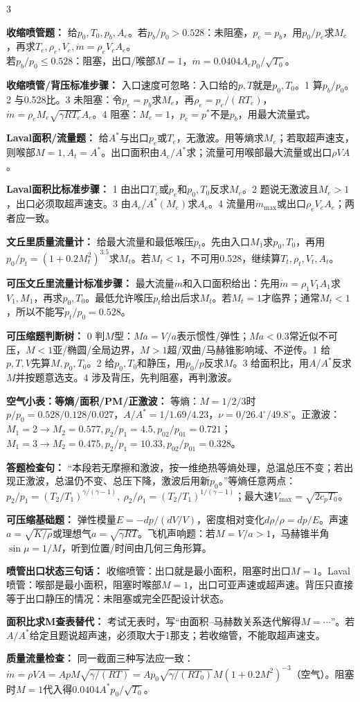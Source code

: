 \documentclass[a4paper]{article}
\newcommand{\sect}[1]{\par{\bfseries\color{Q}#1：}}
\begin{document}
\begin{multicols}{3}
{\sect{收缩喷管题}
给$p_0,T_0,p_b,A_e$。若$p_b/p_0>0.528$：未阻塞，$p_e=p_b$，用$p_0/p_e$求$M_e$，再求$T_e,\rho_e,V_e,\dot m=\rho_eV_eA_e$。\\
若$p_b/p_0\le0.528$：阻塞，出口/喉部$M=1$，$\dot m=0.0404A_ep_0/\sqrt{T_0}$。
\sect{收缩喷管/背压标准步骤}
入口速度可忽略：入口给的$p,T$就是$p_0,T_0$。1 算$p_b/p_0$。2 与0.528比。3 未阻塞：令$p_e=p_b$求$M_e$，再$\rho_e=p_e/(RT_e)$，$\dot m=\rho_eM_e\sqrt{\gamma RT_e}A_e$。4 阻塞：$M_e=1$，$p_e=p^*$不是$p_b$，用最大流量式。

\sect{Laval面积/流量题}
给$A^*$与出口$p_e$或$T_e$，无激波。用等熵求$M_e$；若取超声速支，则喉部$M=1,A_t=A^*$。出口面积由$A_e/A^*$求；流量可用喉部最大流量或出口$\rho VA$。
\sect{Laval面积比标准步骤}
1 由出口$T_e$或$p_e$和$p_0,T_0$反求$M_e$。2 题说无激波且$M_e>1$，出口必须取超声速支。3 由$A_e/A^*(M_e)$求$A_e$。4 流量用$\dot m_{\max}$或出口$\rho_eV_eA_e$；两者应一致。

\sect{文丘里质量流量计}
给最大流量和最低喉压$p_t$。先由入口$M_1$求$p_0,T_0$，再用$p_0/p_t=(1+0.2M_t^2)^{3.5}$求$M_t$。若$M_t<1$，不可用0.528，继续算$T_t,\rho_t,V_t,A_t$。
\sect{可压文丘里流量计标准步骤}
最大流量$\dot m$和入口面积给出：先用$\dot m=\rho_1V_1A_1$求$V_1,M_1$，再求$p_0,T_0$。最低允许喉压$p_t$给出后求$M_t$。若$M_t=1$才临界；通常$M_t<1$，所以不能写$p_t/p_0=0.528$。
\sect{可压缩题判断树}
0 判$M$型：$Ma=V/a$表示惯性/弹性；$Ma<0.3$常近似不可压，$M<1$亚/椭圆/全局边界，$M>1$超/双曲/马赫锥影响域、不逆传。1 给$p,T,V$先算$M,p_0,T_0$。2 给$p_0,T_0$和静压，用$p_0/p$反求$M$。3 给面积比，用$A/A^*$反求$M$并按题意选支。4 涉及背压，先判阻塞，再判激波。
\sect{空气小表：等熵/面积/PM/正激波}
等熵：$M=1/2/3$时$p/p_0=0.528/0.128/0.027$，$A/A^*=1/1.69/4.23$，$\nu=0/26.4^\circ/49.8^\circ$。正激波：$M_1=2\to M_2=0.577,p_2/p_1=4.5,p_{02}/p_{01}=0.721$；$M_1=3\to M_2=0.475,p_2/p_1=10.33,p_{02}/p_{01}=0.328$。
\sect{答题检查句}
“本段若无摩擦和激波，按一维绝热等熵处理，总温总压不变；若出现正激波，总温仍不变、总压下降，激波后用新$p_0$。”等熵任意两点：$p_2/p_1=(T_2/T_1)^{\gamma/(\gamma-1)},\ \rho_2/\rho_1=(T_2/T_1)^{1/(\gamma-1)}$；最大速$V_{\max}=\sqrt{2c_pT_0}$。
\sect{可压缩基础题}
弹性模量$E=-dp/(dV/V)$，密度相对变化$d\rho/\rho=dp/E$。声速$a=\sqrt{K/\rho}$或理想气$a=\sqrt{\gamma RT}$。飞机声响题：若$M=V/a>1$，马赫锥半角$\sin\mu=1/M$，听到位置/时间由几何三角形算。
\sect{喷管出口状态三句话}
收缩喷管：出口就是最小面积，阻塞时出口$M=1$。Laval喷管：喉部是最小面积，阻塞时喉部$M=1$，出口可亚声速或超声速。背压只直接等于出口静压的情况：未阻塞或完全匹配设计状态。
\sect{面积比求M查表替代}
考试无表时，写“由面积--马赫数关系迭代解得$M=\cdots$”。若$A/A^*$给定且题说超声速，必须取大于1那支；若收缩管，不能取超声速支。
\sect{质量流量检查}
同一截面三种写法应一致：$\dot m=\rho VA=ApM\sqrt{\gamma/(RT)}=A p_0\sqrt{\gamma/(RT_0)}M(1+0.2M^2)^{-3}$（空气）。阻塞时$M=1$代入得$0.0404A^*p_0/\sqrt{T_0}$。
}


\end{multicols}
\end{document}

